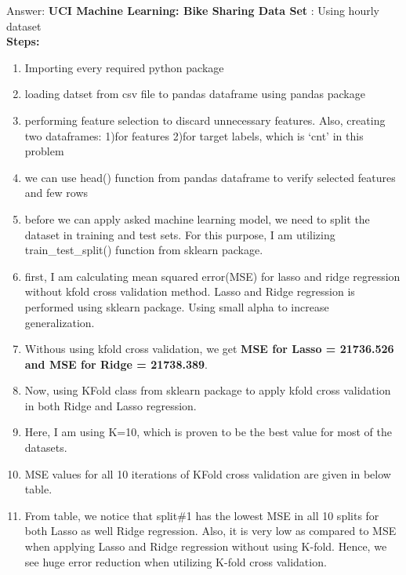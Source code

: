 \documentclass{exam}
\begin{document}
\begin{questions}
Answer: {\bf UCI Machine Learning: Bike Sharing Data Set} : Using hourly dataset\\
{ \bf Steps:}
\begin{enumerate}
  \item Importing every required python package
  \item loading datset from csv file to pandas dataframe using pandas package
  \item performing feature selection to discard unnecessary features. Also, creating two dataframes: 1)for features 2)for target labels, which is `cnt' in this problem
  \item we can use head() function from pandas dataframe to verify selected features and few rows
  \item before we can apply asked machine learning model, we need to split the dataset in training and test sets. For this purpose, I am utilizing train\_test\_split() function from sklearn package.
  \item first, I am calculating mean squared error(MSE) for lasso and ridge regression without kfold cross validation method. Lasso and Ridge regression is performed using sklearn package. Using small alpha to increase generalization.
  \item Withous using kfold cross validation, we get {\bf MSE for Lasso = 21736.526 and MSE for Ridge = 21738.389}.
  \item Now, using KFold class from sklearn package to apply kfold cross validation in both Ridge and Lasso regression.
  \item Here, I am using K=10, which is proven to be the best value for most of the datasets.
  \item MSE values for all 10 iterations of KFold cross validation are given in below table.
  \item From table, we notice that split\#1 has the lowest MSE in all 10 splits for both Lasso as well Ridge regression. Also, it is very low as compared to MSE when applying Lasso and Ridge regression without using K-fold. Hence, we see huge error reduction when utilizing K-fold cross validation.
\end{enumerate}


\end{questions}
\end{document}
